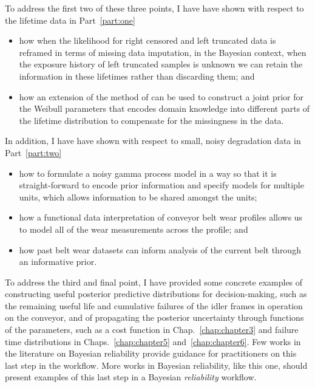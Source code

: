 To address the first two of these three points, I have have shown with respect to the lifetime data in Part~\ref{part:one} 
\begin{itemize}
  \item how when the likelihood for right censored and left truncated data is reframed in terms of missing data imputation, in the Bayesian context, when the exposure history of left truncated samples is unknown we can retain the information in these lifetimes rather than discarding them; and
  \item how an extension of the method of \citet{kaminskiy2005} can be used to construct a joint prior for the Weibull parameters that encodes domain knowledge into different parts of the lifetime distribution to compensate for the missingness in the data.
\end{itemize}
In addition, I have have shown with respect to small, noisy degradation data in Part~\ref{part:two}
\begin{itemize}
  \item how to formulate a noisy gamma process model in a way so that it is straight-forward to encode prior information and specify models for multiple units, which allows information to be shared amongst the units;
  \item how a functional data interpretation of conveyor belt wear profiles allows us to model all of the wear measurements across the profile; and
  \item how past belt wear datasets can inform analysis of the current belt through an informative prior.
\end{itemize}
To address the third and final point, I have provided some concrete examples of constructing useful posterior predictive distributions for decision-making, such as the remaining useful life and cumulative failures of the idler frames in operation on the conveyor, and of propagating the posterior uncertainty through functions of the parameters, such as a cost function in Chap.~\ref{chap:chapter3} and failure time distributions in Chaps.~\ref{chap:chapter5} and~\ref{chap:chapter6}. Few works in the literature on Bayesian reliability provide guidance for practitioners on this last step in the workflow. More works in Bayesian reliability, like this one, should present examples of this last step in a Bayesian \emph{reliability} workflow.
